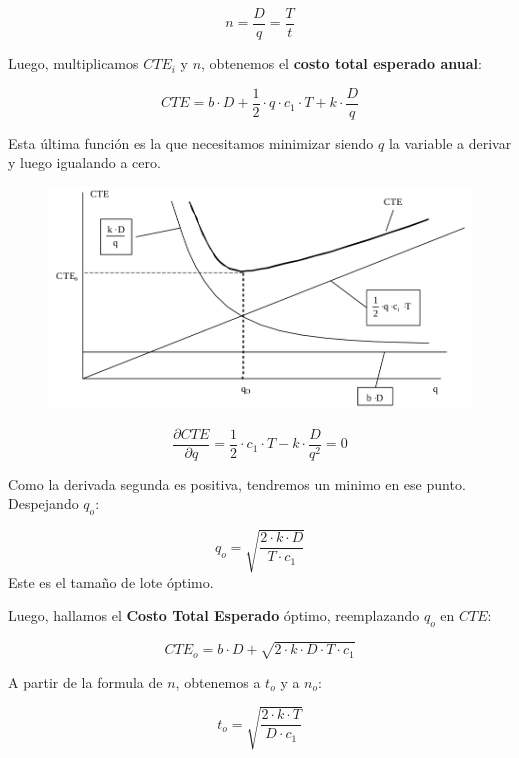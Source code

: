 \documentclass{article}
\begin{document}
\begin{equation}
    n=\frac{D}{q}=\frac{T}{t}
\end{equation}


Luego, multiplicamos \(CTE_i\) y \(n\), obtenemos el \textbf{costo total esperado anual}:


\begin{equation}
    CTE= b \cdot D +\frac{1}{2} \cdot q \cdot c_1 \cdot T + k \cdot \frac{D}{q}
\end{equation}


Esta última función es la que necesitamos minimizar siendo \(q\) la variable a derivar y 
luego igualando a cero.

\begin{figure}[h!]
    \includegraphics[width=\linewidth]{imagenes/stock-q-optimo.png}
\end{figure}

\[
    \frac{\partial CTE}{ \partial q} = \frac{1}{2} \cdot c_1 \cdot T - k \cdot \frac{D}{q^2} = 0
\]

Como la derivada segunda es positiva, tendremos un minimo en ese punto. Despejando \(q_o\):

\begin{equation}
    q_o = \sqrt{\frac{2 \cdot k \cdot D}{T \cdot c_1}}
\end{equation}
Este es el tamaño de lote óptimo.

Luego, hallamos el \textbf{Costo Total Esperado} óptimo, reemplazando \(q_o\) en \(CTE\):

\begin{equation}
    CTE_o = b \cdot D + \sqrt{2 \cdot k \cdot D \cdot T \cdot c_1}
\end{equation}

A partir de la formula de \(n\), obtenemos a \(t_o\) y a \(n_o\):

\begin{equation}
    t_o = \sqrt{\frac{2 \cdot k \cdot T}{D \cdot c_1}}
\end{equation}
\end{document}
